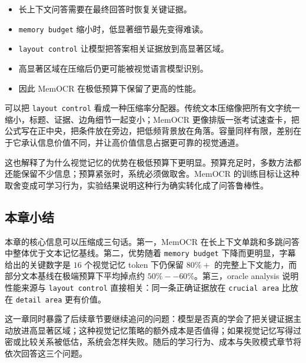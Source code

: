 \begin{itemize}
    \item 长上下文问答需要在最终回答时恢复关键证据。
    \item \texttt{memory budget} 缩小时，低显著细节最先变得难读。
    \item \texttt{layout control} 让模型把答案相关证据放到高显著区域。
    \item 高显著区域在压缩后仍更可能被视觉语言模型识别。
    \item 因此 MemOCR 在极低预算下保留了更高的性能。
\end{itemize}

可以把 \texttt{layout control} 看成一种压缩率分配器。传统文本压缩像把所有文字统一缩小，标题、证据、边角细节一起变小；MemOCR 更像排版一张考试速查卡，把公式写在正中央，把条件放在旁边，把低频背景放在角落。容量同样有限，差别在于它承认信息价值不同，并让高价值信息占据更可靠的视觉通道。

这也解释了为什么视觉记忆的优势在极低预算下更明显。预算充足时，多数方法都还能保留不少信息；预算紧张时，系统必须做取舍。MemOCR 的训练目标让这种取舍变成可学习行为，实验结果说明这种行为确实转化成了问答鲁棒性。

\subsection{本章小结}

本章的核心信息可以压缩成三句话。第一，MemOCR 在长上下文单跳和多跳问答中整体优于文本记忆基线。第二，优势随着 \texttt{memory budget} 下降而更明显，字幕给出的关键数字是 $16$ 个视觉记忆 token 下仍保留 $80\%+$ 的完整上下文能力，而部分文本基线在极端预算下平均掉点约 $50\%--60\%$。第三，oracle analysis 说明性能来源与 \texttt{layout control} 直接相关：同一条正确证据放在 \texttt{crucial area} 比放在 \texttt{detail area} 更有价值。

这一章同时暴露了后续章节要继续追问的问题：模型是否真的学会了把关键证据主动放进高显著区域；这种视觉记忆策略的额外成本是否值得；如果视觉记忆写得过密或比较关系被低估，系统会怎样失败。随后的学习行为、成本与失败模式章节将依次回答这三个问题。
